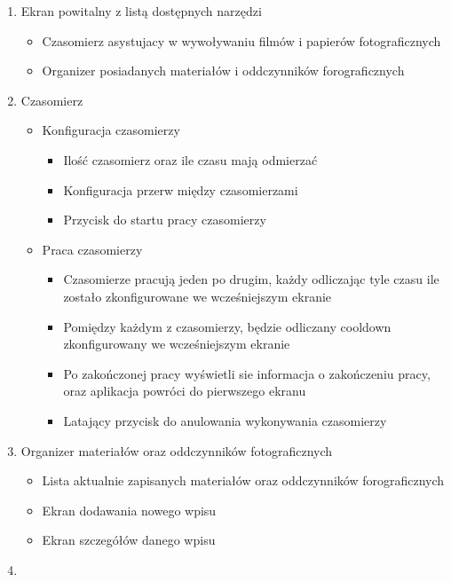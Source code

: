 \documentclass[12pt,a4paper]{article}
\begin{document}
\begin{enumerate}
    \item Ekran powitalny z listą dostępnych narzędzi
    \begin{itemize}
        \item Czasomierz asystujacy w wywoływaniu filmów i papierów fotograficznych
        \item Organizer posiadanych materiałów i oddczynników forograficznych
    \end{itemize}
    \item Czasomierz
    \begin{itemize}
        \item Konfiguracja czasomierzy
        \begin{itemize}
            \item Ilość czasomierz oraz ile czasu mają odmierzać
            \item Konfiguracja przerw między czasomierzami
            \item Przycisk do startu pracy czasomierzy
        \end{itemize}
        \item Praca czasomierzy
        \begin{itemize}
            \item Czasomierze pracują jeden po drugim, każdy odliczając tyle czasu ile zostało zkonfigurowane we wcześniejszym ekranie
            \item Pomiędzy każdym z czasomierzy, będzie odliczany cooldown zkonfigurowany we wcześniejszym ekranie
            \item Po zakończonej pracy wyświetli sie informacja o zakończeniu pracy, oraz aplikacja powróci do pierwszego ekranu
            \item Latający przycisk do anulowania wykonywania czasomierzy
        \end{itemize}
    \end{itemize}
    \item Organizer materiałów oraz oddczynników fotograficznych
    \begin{itemize}
        \item Lista aktualnie zapisanych materiałów oraz oddczynników forograficznych
        \item Ekran dodawania nowego wpisu
        \item Ekran szczegółów danego wpisu 
    \end{itemize}
    \item 
\end{enumerate}
\end{document}
